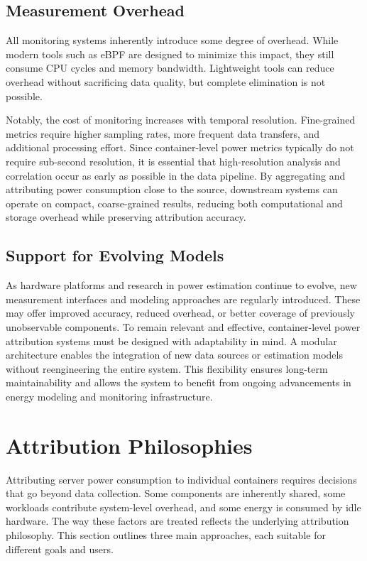 \subsection*{Measurement Overhead}
\label{sec:measurement_overhead}

All monitoring systems inherently introduce some degree of overhead. While modern tools such as eBPF are designed to minimize this impact, they still consume CPU cycles and memory bandwidth. Lightweight tools can reduce overhead without sacrificing data quality, but complete elimination is not possible.

Notably, the cost of monitoring increases with temporal resolution. Fine-grained metrics require higher sampling rates, more frequent data transfers, and additional processing effort. Since container-level power metrics typically do not require sub-second resolution, it is essential that high-resolution analysis and correlation occur as early as possible in the data pipeline. By aggregating and attributing power consumption close to the source, downstream systems can operate on compact, coarse-grained results, reducing both computational and storage overhead while preserving attribution accuracy.

\subsection*{Support for Evolving Models}
\label{sec:evolving_models}

As hardware platforms and research in power estimation continue to evolve, new measurement interfaces and modeling approaches are regularly introduced. These may offer improved accuracy, reduced overhead, or better coverage of previously unobservable components. To remain relevant and effective, container-level power attribution systems must be designed with adaptability in mind. A modular architecture enables the integration of new data sources or estimation models without reengineering the entire system. This flexibility ensures long-term maintainability and allows the system to benefit from ongoing advancements in energy modeling and monitoring infrastructure.

\section{Attribution Philosophies}
\label{sec:attribution-philosophies}

Attributing server power consumption to individual containers requires decisions that go beyond data collection. Some components are inherently shared, some workloads contribute system-level overhead, and some energy is consumed by idle hardware. The way these factors are treated reflects the underlying attribution philosophy. This section outlines three main approaches, each suitable for different goals and users.

